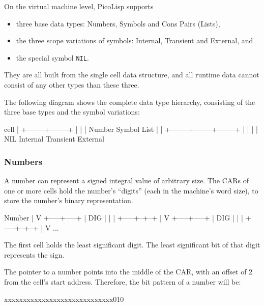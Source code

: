 On the virtual machine level, PicoLisp supports

\begin{itemize}
\item three base data types: Numbers, Symbols and Cons Pairs (Lists),
\item the three scope variations of symbols: Internal, Transient and
   External, and
\item the special symbol \texttt{NIL}.
\end{itemize}

They are all built from the single cell data structure, and all runtime
data cannot consist of any other types than these three.

The following diagram shows the complete data type hierarchy, consisting
of the three base types and the symbol variations:


\begin{wideverbatim}
                  cell
                   |
          +--------+--------+
          |        |        |
       Number    Symbol    List
                   |
                   |
 +--------+--------+--------+
 |        |        |        |
NIL   Internal Transient External
\end{wideverbatim}


\subsubsection{Numbers}
\label{sec:refm-numbers}%
A number can represent a signed integral value of arbitrary size. The
CARs of one or more cells hold the number's ``digits'' (each in the
machine's word size), to store the number's binary representation.


\begin{wideverbatim}
   Number
   |
   V
+-----+-----+
| DIG |  |  |
+-----+--+--+
         |
         V
      +-----+-----+
      | DIG |  |  |
      +-----+--+--+
               |
               V
              ...
\end{wideverbatim}

The first cell holds the least significant digit. The least significant
bit of that digit represents the sign.

The pointer to a number points into the middle of the CAR, with an
offset of 2 from the cell's start address. Therefore, the bit pattern of
a number will be:


\begin{wideverbatim}
xxxxxxxxxxxxxxxxxxxxxxxxxxxxx010
\end{wideverbatim}

